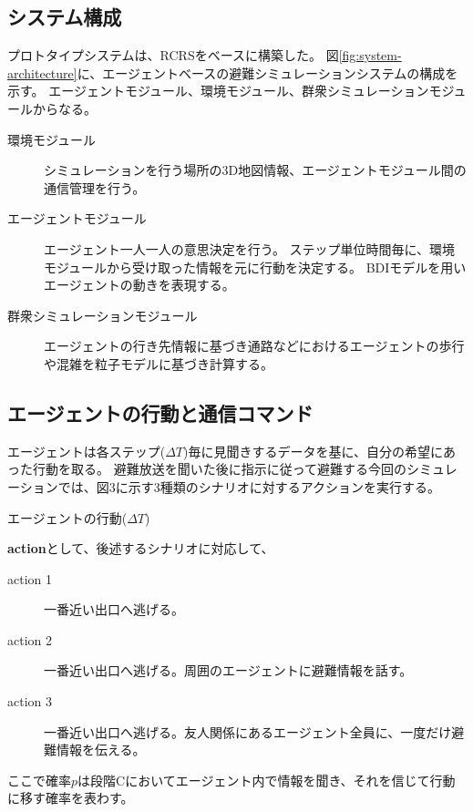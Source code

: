 \documentclass[a4j]{jarticle}
\begin{document}
\subsection{システム構成}
プロトタイプシステムは、RCRSをベースに構築した。
図\ref{fig:system-architecture}に、エージェントベースの避難シミュレーションシステムの構成を示す。
エージェントモジュール、環境モジュール、群衆シミュレーションモジュールからなる。
\begin{description}
\item[環境モジュール]{
  シミュレーションを行う場所の3D地図情報、エージェントモジュール間の通信管理を行う。
}
\item[エージェントモジュール]{
  エージェント一人一人の意思決定を行う。
  ステップ単位時間毎に、環境モジュールから受け取った情報を元に行動を決定する。
  BDIモデルを用いエージェントの動きを表現する。
}
\item[群衆シミュレーションモジュール]{
  エージェントの行き先情報に基づき通路などにおけるエージェントの歩行や混雑を粒子モデルに基づき計算する。
}
\end{description}

\subsection{エージェントの行動と通信コマンド}
エージェントは各ステップ($\Delta T$)毎に見聞きするデータを基に、自分の希望にあった行動を取る。
避難放送を聞いた後に指示に従って避難する今回のシミュレーションでは、図3に示す3種類のシナリオに対するアクションを実行する。

\begin{algorithm}
\caption{エージェントの行動($\Delta T$)}
\begin{algorithmic}[1]
  \EndIf
\end{algorithmic}
\end{algorithm}
{\bfseries action}として、後述するシナリオに対応して、
\begin{description}
 \item[action 1] 一番近い出口へ逃げる。
 \item[action 2] 一番近い出口へ逃げる。周囲のエージェントに避難情報を話す。
 \item[action 3] 一番近い出口へ逃げる。友人関係にあるエージェント全員に、一度だけ避難情報を伝える。
\end{description}
ここで確率$p$は段階Cにおいてエージェント内で情報を聞き、それを信じて行動に移す確率を表わす。
\end{document}
